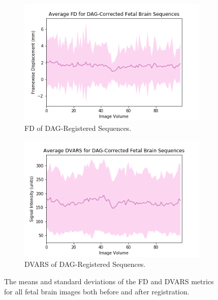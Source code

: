 \begin{figure}[t]
	\begin{subfigure}{0.4\textwidth}
		\centering
		\includegraphics[width=1.0\textwidth]{6/figures/fetal-brain-dag-fd-150.png}
		\caption{FD of DAG-Registered Sequences.}
	\end{subfigure}
	\hspace{0.05\textwidth}
	\begin{subfigure}{0.4\textwidth}
		\centering
		\includegraphics[width=1.0\textwidth]{6/figures/fetal-brain-dag-dvars-150.png}
		\caption{DVARS of DAG-Registered Sequences.}
	\end{subfigure}
\caption{The means and standard deviations of the FD and DVARS metrics for all fetal brain images both before and after registration.}
\label{fig:fetal-brain-power-dists}
\end{figure}

